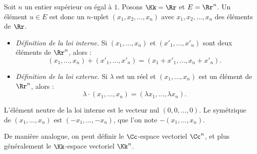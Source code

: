 \documentclass[class=report,crop=false]{standalone}
\begin{document}
\begin{exemple}
    Soit $n$ un entier supérieur ou égal à $1$.
   Posons $\Kk=\Rr$ et $E=\Rr^n$.
   Un élément $u\in E$ est donc un $n$-uplet
   $(x_1,x_2, \ldots , x_n)$ avec $x_1,x_2, \ldots , x_n$ des éléments de $\Rr$.

   \begin{itemize}
    \item \emph{Définition de la loi interne.}
  Si $(x_1, \dots , x_n)$ et $(x'_1, \dots , x'_n)$ sont deux éléments de $\Rr^n$, alors :
  $$(x_1, \dots , x_n)+(x'_1, \dots , x'_n)=
  (x_1+x'_1, \dots , x_n+x'_n).$$


    \item \emph{Définition  de la loi externe.}
      Si $\lambda$ est un réel et $(x_1, \dots , x_n)$ est un élément de $\Rr^n$, alors :
  $$\lambda \cdot (x_1, \dots , x_n)=(\lambda x_1,\dots ,  \lambda x_n).$$

    \end{itemize}

L'élément neutre de la loi interne est le vecteur nul $(0,0, \dots, 0)$.
Le symétrique de    $(x_1, \dots , x_n)$ est $(-x_1, \dots , -x_n)$, que l'on note
$-(x_1, \dots , x_n)$.

De manière analogue, on peut définir le $\Cc$-espace vectoriel $\Cc^n$, et plus généralement le
$\Kk$-espace vectoriel $\Kk^n$.
\end{exemple}
\end{document}
